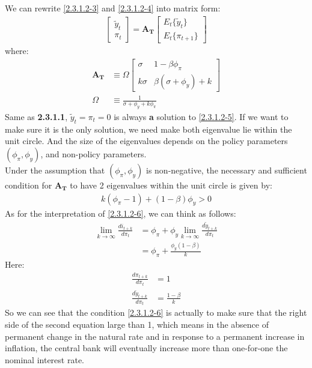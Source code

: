 \documentclass{article}
\numberwithin{equation}{section}
\begin{document}
We can rewrite \eqref{2.3.1.2-3} and \eqref{2.3.1.2-4} into matrix form:
	\begin{align}
		\begin{bmatrix}
			\tilde{y}_t\\
			\pi_t
		\end{bmatrix} = \boldsymbol{A_T}
		\begin{bmatrix}
			E_t\{\tilde{y}_t\}\\
			E_t\{\pi_{t+1}\}
		\end{bmatrix} \label{2.3.1.2-5}
	\end{align}
where:
	\begin{align*}
		\boldsymbol{A_T} &\equiv \Omega
		\begin{bmatrix}
			\sigma & 1 - \beta\phi_\pi\\
			k\sigma & \beta(\sigma + \phi_y) + k 
		\end{bmatrix}\\
		\Omega &\equiv \frac{1}{\sigma + \phi_y + k\phi_\pi}	
	\end{align*}
Same as \textbf{2.3.1.1}, $\tilde{y}_t = \pi_t = 0$ is always \textbf{a} solution to \eqref{2.3.1.2-5}. If we want to make sure it is the only solution, we need make both eigenvalue lie within the unit circle. And the size of the eigenvalues depends on the policy parameters $(\phi_\pi, \phi_y)$, and non-policy parameters.\\
Under the assumption that $(\phi_\pi, \phi_y)$ is non-negative, the necessary and sufficient condition for $\boldsymbol{A_T}$ to have 2 eigenvalues within the unit circle is given by:
	\begin{align}
		k(\phi_\pi - 1) + (1 - \beta)\phi_y > 0 \label{2.3.1.2-6}
	\end{align}
As for the interpretation of \eqref{2.3.1.2-6}, we can think as follows:
	\begin{align*}
		\lim\limits_{k\to\infty} \frac{di_{t+k}}{d\pi_t} &= \phi_\pi + \phi_y \lim\limits_{k\to\infty} \frac{d\tilde{y}_{t+k}}{d\pi_t}\\
		&= \phi_\pi + \frac{\phi_y(1 - \beta)}{k}
	\end{align*}
Here:
	\begin{align*}
		\frac{d\pi_{t+k}}{d\pi_t} &= 1\\
		\frac{d\tilde{y}_{t+k}}{d\pi_t} &= \frac{1- \beta}{k}
	\end{align*}
So we can see that the condition \eqref{2.3.1.2-6} is actually to make sure that the right side of the second equation large than 1, which means in the absence of permanent change in the natural rate and in response to a permanent increase in inflation, the central bank will eventually increase more than one-for-one the nominal interest rate.\\
\end{document}
